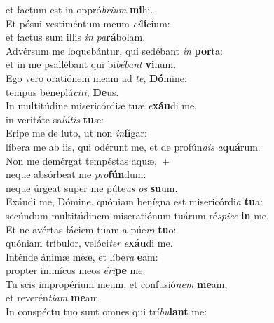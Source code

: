 \oddverse et factum est in oppró\textit{bri}\textit{um} \textbf{mi}hi.\\
\evenverse Et pósui vestiméntum meum \textit{ci}\textbf{lí}cium:~\*\\
\evenverse et factus sum illis \textit{in} \textit{pa}\textbf{rá}bolam.\\
\oddverse Advérsum me loquebántur, qui sedébant \textit{in} \textbf{por}ta:~\*\\
\oddverse et in me psallébant qui bi\textit{bé}\textit{bant} \textbf{vi}num.\\
\evenverse Ego vero oratiónem meam ad \textit{te}, \textbf{Dó}mine:~\*\\
\evenverse tempus beneplá\textit{ci}\textit{ti}, \textbf{De}us.\\
\oddverse In multitúdine misericórdiæ tuæ \textit{e}\textbf{xáu}di me,~\*\\
\oddverse in veritáte sa\textit{lú}\textit{tis} \textbf{tu}æ:\\
\evenverse Eripe me de luto, ut non \textit{in}\textbf{fí}gar:~\*\\
\evenverse líbera me ab iis, qui odérunt me, et de profún\textit{dis} \textit{a}\textbf{quá}rum.\\
\oddverse Non me demérgat tempéstas aquæ,~+\\
\oddverse  neque absórbeat me \textit{pro}\textbf{fún}dum:~\*\\
\oddverse neque úrgeat super me púte\textit{us} \textit{os} \textbf{su}um.\\
\evenverse Exáudi me, Dómine, quóniam benígna est misericórdi\textit{a} \textbf{tu}a:~\*\\
\evenverse secúndum multitúdinem miseratiónum tuárum ré\textit{spi}\textit{ce} \textbf{in} me.\\
\oddverse Et ne avértas fáciem tuam a púe\textit{ro} \textbf{tu}o:~\*\\
\oddverse quóniam tríbulor, velóci\textit{ter} \textit{e}\textbf{xáu}di me.\\
\evenverse Inténde ánimæ meæ, et líbe\textit{ra} \textbf{e}am:~\*\\
\evenverse propter inimícos meos \textit{é}\textit{ri}\textbf{pe} me.\\
\oddverse Tu scis impropérium meum, et confusió\textit{nem} \textbf{me}am,~\*\\
\oddverse et reverén\textit{ti}\textit{am} \textbf{me}am.\\
\evenverse In conspéctu tuo sunt omnes qui trí\textit{bu}\textbf{lant} me:~\*\\
